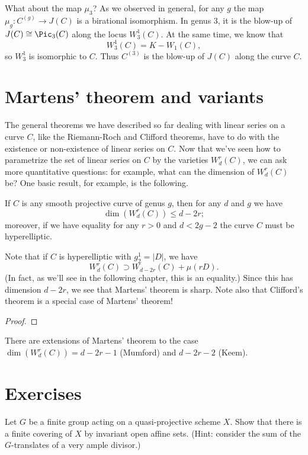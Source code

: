 What about the map $\mu_3$? As we observed in general, for any $g$ the map $\mu_g : C^{(g)} \to J(C)$ is a birational isomorphism. In genus 3, it is the blow-up of $J(C) \cong \Pic_3(C)$ along the locus $W^1_3(C)$. At the same time, we know that
$$
W^1_3(C) = K - W_1(C),
$$
so $W^1_3$ is isomorphic to $C$. Thus $C^{(3)}$ is the blow-up of $J(C)$ along the curve $C$.

\section{Martens' theorem and variants}

The general theorems we have described so far dealing with linear series on a curve $C$, like the Riemann-Roch and Clifford theorems, have to do with the existence or non-existence of linear series on $C$. Now that we've seen how to parametrize the set of linear series on $C$ by the varieties $W^r_d(C)$, we can ask more quantitative questions: for example, what can the dimension of $W^r_d(C)$ be? One basic result, for example, is the following.

\begin{theorem}
If $C$ is any smooth projective curve of genus $g$, then for any $d$ and $g$ we have
$$
\dim(W^r_d(C)) \leq d-2r;
$$
moreover, if we have equality for any $r > 0$ and $d < 2g-2$ the curve $C$ must be hyperelliptic.
\end{theorem}

Note that if $C$ is hyperelliptic with $g^1_2 = |D|$, we have
$$
W^r_d(C) \supset W_{d-2r}(C) + \mu(rD).
$$
(In fact, as we'll see in the following chapter, this is an equality.) Since this has dimension $d-2r$, we see that Martens' theorem is sharp. Note also that Clifford's theorem is a special case of Martens' theorem!

\begin{proof}

\end{proof}

There are extensions of Martens' theorem to the case $\dim(W^r_d(C)) = d-2r-1$ (Mumford) and $d-2r-2$ (Keem).

\section{Exercises}

\begin{exercise}
 Let $G$ be a finite group acting on a quasi-projective scheme $X$. Show that there is a finite covering of $X$ by invariant open affine sets. (Hint: consider the sum of the $G$-translates of a very ample divisor.)
\end{exercise}

